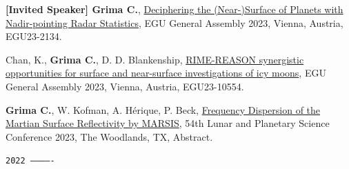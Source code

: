 \begin{etaremune}
\item
    \textbf{[Invited Speaker] Grima C.}, \href{https://meetingorganizer.copernicus.org/EGU23/EGU23-2134.html}{Deciphering the (Near-)Surface of Planets with Nadir-pointing Radar Statistics}, EGU General Assembly 2023, Vienna, Austria, EGU23-2134.

\item
    Chan, K., \textbf{Grima C.}, D. D. Blankenship, \href{https://meetingorganizer.copernicus.org/EGU23/EGU23-10554.html}{RIME-REASON synergistic opportunities for surface and near-surface investigations of icy moons}, EGU General Assembly 2023, Vienna, Austria, EGU23-10554.

\item
    \textbf{Grima C.}, W. Kofman, A. Hérique, P. Beck, \href{https://www.hou.usra.edu/meetings/lpsc2023/pdf/1120.pdf}{Frequency Dispersion of the Martian Surface Reflectivity by MARSIS}, 54th Lunar and Planetary Science Conference 2023, The Woodlands, TX, Abstract.

\hspace{-2em}\texttt{2022 -------------}


\end{etaremune}
